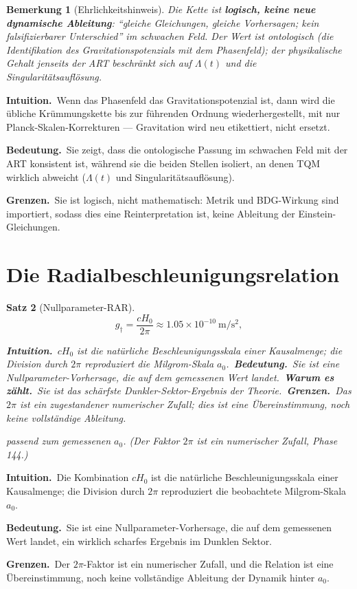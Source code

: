 \documentclass[10pt,twoside,openany]{book}
\newtheorem{theorem}{Satz}[chapter]
\newtheorem{remark}[theorem]{Bemerkung}
\newcommand{\theoremnotes}[3]{%
  \par\medskip\noindent
  \textbf{Intuition.}\ #1\par
  \textbf{Bedeutung.}\ #2\par
  \textbf{Grenzen.}\ #3\par}
\newcommand{\eqnotes}[4]{%
  \par\smallskip\noindent
  \textbf{Intuition.}\ #1\ 
  \textbf{Bedeutung.}\ #2\ 
  \textbf{Warum es zählt.}\ #3\ 
  \textbf{Grenzen.}\ #4\par}
\begin{document}
\begin{remark}[Ehrlichkeitshinweis]
Die Kette ist \textbf{logisch, keine neue dynamische Ableitung}: ``gleiche Gleichungen,
gleiche Vorhersagen; kein falsifizierbarer Unterschied'' im schwachen Feld. Der Wert ist
\emph{ontologisch} (die Identifikation des Gravitationspotenzials mit dem Phasenfeld); der
physikalische Gehalt jenseits der ART beschränkt sich auf $\Lambda(t)$ und die
Singularitätsauflösung.
\end{remark}

\theoremnotes
{Wenn das Phasenfeld das Gravitationspotenzial ist, dann wird die übliche Krümmungskette
bis zur führenden Ordnung wiederhergestellt, mit nur Planck-Skalen-Korrekturen ---
Gravitation wird neu etikettiert, nicht ersetzt.}
{Sie zeigt, dass die ontologische Passung im schwachen Feld mit der ART konsistent ist,
während sie die beiden Stellen isoliert, an denen TQM wirklich abweicht ($\Lambda(t)$ und
Singularitätsauflösung).}
{Sie ist logisch, nicht mathematisch: Metrik und BDG-Wirkung sind importiert, sodass dies
eine Reinterpretation ist, keine Ableitung der Einstein-Gleichungen.}

\section{Die Radialbeschleunigungsrelation}

\begin{theorem}[Nullparameter-RAR]
\begin{equation}
g_\dagger = \frac{c H_0}{2\pi} \approx 1.05\times10^{-10}\ \mathrm{m/s^2},
\end{equation}

\eqnotes
{$cH_0$ ist die natürliche Beschleunigungsskala einer Kausalmenge; die Division durch
$2\pi$ reproduziert die Milgrom-Skala $a_0$.}
{Sie ist eine Nullparameter-Vorhersage, die auf dem gemessenen Wert landet.}
{Sie ist das schärfste Dunkler-Sektor-Ergebnis der Theorie.}
{Das $2\pi$ ist ein zugestandener numerischer Zufall; dies ist eine Übereinstimmung, noch
keine vollständige Ableitung.}
passend zum gemessenen $a_0$. (Der Faktor $2\pi$ ist ein numerischer Zufall, Phase 144.)
\end{theorem}

\theoremnotes
{Die Kombination $cH_0$ ist die natürliche Beschleunigungsskala einer Kausalmenge; die
Division durch $2\pi$ reproduziert die beobachtete Milgrom-Skala $a_0$.}
{Sie ist eine Nullparameter-Vorhersage, die auf dem gemessenen Wert landet, ein wirklich
scharfes Ergebnis im Dunklen Sektor.}
{Der $2\pi$-Faktor ist ein numerischer Zufall, und die Relation ist eine Übereinstimmung,
noch keine vollständige Ableitung der Dynamik hinter $a_0$.}
\end{document}
